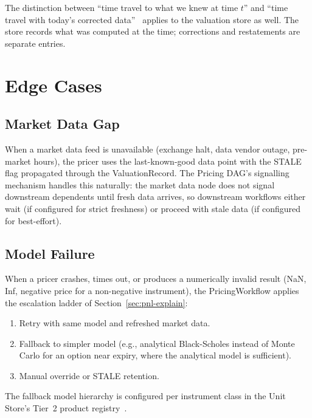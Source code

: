 \documentclass[11pt,a4paper]{article}
\begin{document}
\noindent The distinction between ``time travel to what we knew at time $t$'' and ``time travel with today's corrected data''~\cite[\S1.2]{ledger} applies to the valuation store as well.  The store records what was computed at the time; corrections and restatements are separate entries.

\clearpage
\section{Edge Cases}
\label{sec:edge-cases}

\subsection{Market Data Gap}

When a market data feed is unavailable (exchange halt, data vendor outage, pre-market hours), the pricer uses the last-known-good data point with the STALE flag propagated through the ValuationRecord.  The Pricing DAG's signalling mechanism handles this naturally: the market data node does not signal downstream dependents until fresh data arrives, so downstream workflows either wait (if configured for strict freshness) or proceed with stale data (if configured for best-effort).

\subsection{Model Failure}

When a pricer crashes, times out, or produces a numerically invalid result (NaN, Inf, negative price for a non-negative instrument), the PricingWorkflow applies the escalation ladder of Section~\ref{sec:pnl-explain}:

\begin{enumerate}[nosep]
\item Retry with same model and refreshed market data.
\item Fallback to simpler model (e.g., analytical Black-Scholes instead of Monte Carlo for an option near expiry, where the analytical model is sufficient).
\item Manual override or STALE retention.
\end{enumerate}

\noindent The fallback model hierarchy is configured per instrument class in the Unit Store's Tier~2 product registry~\cite[\S3.2.2]{ledger}.
\end{document}
